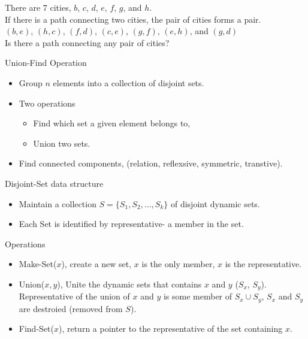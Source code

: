 \documentclass{beamer}
\begin{document}
\begin{frame}{}
There are 7 cities, $b$, $c$, $d$, $e$, $f$, $g$, and $h$. \\
If there is a path connecting two cities, the pair of cities forms a pair. \\
$(b,e)$, $(h,c)$, $(f,d)$, $(c,e)$, $(g,f)$, $(e,h)$, and $(g,d)$ \\
Is there a path connecting any pair of cities? 
\end{frame}

\begin{frame}{}

\centerline{\Large Union-Find Operation}
\begin{itemize}
\item Group $n$ elements into a collection of disjoint sets. 
\item Two operations
\begin{itemize}
\item {\small Find which set a given element belongs to,}
\item {\small Union two sets.}
\end{itemize}
\item Find connected components, ({\small relation,
 reflexsive, symmetric, transtive}).
\end{itemize}
\end{frame}

\begin{frame}{}

\centerline{Disjoint-Set data structure}
\begin{itemize}
\item Maintain a collection $S=\{S_1,S_2,\ldots,S_k\}$ of disjoint dynamic
 sets.
\item Each Set is identified by representative- a member in the set.  
\end{itemize}

\centerline{Operations}
\begin{itemize}
\item Make-Set($x$), create a new set, $x$ is the only member, $x$ is the
 representative.  
\item Union($x,y$), Unite the dynamic sets that contains $x$ and $y$ ($S_x$,
$S_y$). Representative of the union of $x$ and $y$ is some member of 
 $S_x\cup S_y$, $S_x$ and $S_y$ are destroied (removed from $S$). 
\item Find-Set($x$), return a pointer to the representative of the set
 containing $x$.   
\end{itemize}
\end{frame}
\end{document}
